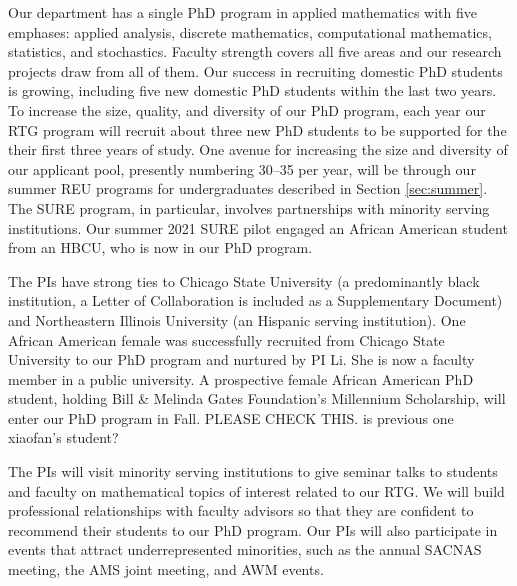 \documentclass[11pt]{NSFamsart}
\begin{document}
{Our department has a single PhD program in applied mathematics with five emphases: applied analysis, discrete mathematics, computational mathematics, statistics, and stochastics.  Faculty strength covers all five areas and our research projects draw from all of them. Our success in recruiting domestic PhD students is growing, including five new domestic PhD students within the last two years. 
To increase the size, quality, and diversity of our PhD program, each year our RTG program will recruit about three new PhD students to be supported for the their first three years of study.  One avenue for increasing the size and diversity of our applicant pool, presently numbering 30--35 per year, will be through our summer REU programs for undergraduates described in Section \ref{sec:summer}.  The SURE program, in particular, involves partnerships with minority serving institutions.  Our summer 2021 SURE pilot engaged an African American student from an HBCU, who is now in our PhD program.  


The PIs have strong ties to Chicago State University (a predominantly black institution, a Letter of Collaboration is included as a Supplementary Document) and Northeastern Illinois University (an Hispanic serving institution). One African American female was successfully recruited from Chicago State University to our PhD program and nurtured by PI Li.  She is now a faculty member in a public university. A prospective female  African American  PhD student, holding Bill \& Melinda Gates Foundation's Millennium Scholarship, will enter our PhD program in Fall. {\color{red}PLEASE CHECK THIS. is previous one xiaofan's student?}


The PIs will visit minority serving institutions to give seminar talks to students and faculty on mathematical topics of interest related to our RTG.  We will build professional relationships with faculty advisors so that they are confident to recommend their students to our PhD program.  Our PIs will also participate in events that attract underrepresented minorities, such as the annual SACNAS meeting, the AMS joint meeting, and AWM events.

}
\end{document}
